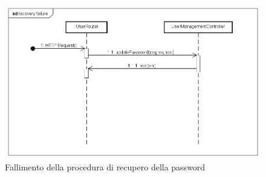 \begin{itemize}
\label{Fallimento procedura di recupero password}
\begin{figure}[ht]
	\centering
	\includegraphics[scale=0.40]{UML/DiagrammiDiSequenza/Back-end/POST__lang_recovery_failure.png}
	\caption{Fallimento della procedura di recupero della password}
\end{figure}
\FloatBarrier

\end{itemize}
